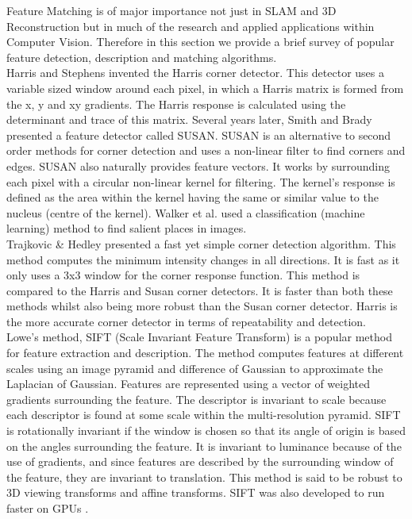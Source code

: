 Feature Matching is of major importance not just in SLAM and 3D Reconstruction but in much of the research and applied applications within Computer Vision. Therefore in this section we provide a brief survey of popular feature detection, description and matching algorithms. \\

Harris and Stephens \cite{Harris88Combined} invented the Harris corner detector. This detector uses a variable sized window around each pixel, in which a Harris matrix is formed from the x, y and xy gradients. The Harris response is calculated using the determinant and trace of this matrix. Several years later, Smith and Brady \cite{Smith97Susan, Smith92New} presented a feature detector called SUSAN. SUSAN is an alternative to second order methods for corner detection and uses a non-linear filter to find corners and edges. SUSAN also naturally provides feature vectors. It works by surrounding each pixel with a circular non-linear kernel for filtering. The kernel's response is defined as the area within the kernel having the same or similar value to the nucleus (centre of the kernel). Walker et al. \cite{Walker98Locating} used a classification (machine learning) method to find salient places in images.\\


Trajkovic \& Hedley \cite{Trajkovic98Fast} presented a fast yet simple corner detection algorithm. This method computes the minimum intensity changes in all directions. It is fast as it only uses a 3x3 window for the corner response function. This method is compared to the Harris and Susan corner detectors. It is faster than both these methods whilst also being more robust than the Susan corner detector. Harris is the more accurate corner detector in terms of repeatability and detection.\\


Lowe's \cite{Lowe04Distinctive,Lowe99Object} method, SIFT (Scale Invariant Feature Transform) is a popular method for feature extraction and description. The method computes features at different scales using an image pyramid and difference of Gaussian to approximate the Laplacian of Gaussian. Features are represented using a vector of weighted gradients surrounding the feature. The descriptor is invariant to scale because each descriptor is found at some scale within the multi-resolution pyramid. SIFT is rotationally invariant if the window is chosen so that its angle of origin is based on the angles surrounding the feature. It is invariant to luminance because of the use of gradients, and since features are described by the surrounding window of the feature, they are invariant to translation. This method is said to be robust to 3D viewing transforms and affine transforms. SIFT was also developed to run faster on GPUs \cite{Wu07Siftgpu}. \\


